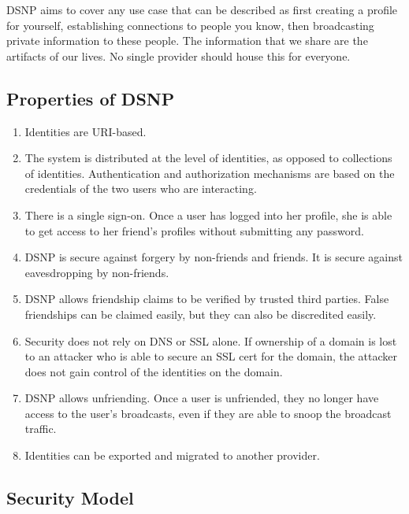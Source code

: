 \documentclass[letterpaper,11pt,oneside]{article}
\begin{document}
DSNP aims to cover any use case that can be described as first creating a
profile for yourself, establishing connections to people you know, then
broadcasting private information to these people. The information that we share
are the artifacts of our lives. No single provider should house this for
everyone.

\subsection{Properties of DSNP}

\begin{enumerate}

\item Identities are URI-based.

\item The system is distributed at the level of identities, as opposed to
collections of identities. Authentication and authorization mechanisms are
based on the credentials of the two users who are interacting.

\item There is a single sign-on. Once a user has logged into her profile, she
is able to get access to her friend's profiles without submitting any password.

\item DSNP is secure against forgery by non-friends and friends. It is secure
against eavesdropping by non-friends.

\item DSNP allows friendship claims to be verified by trusted third parties.
False friendships can be claimed easily, but they can also be discredited
easily.

\item Security does not rely on DNS or SSL alone. If ownership of a domain is
lost to an attacker who is able to secure an SSL cert for the domain, the
attacker does not gain control of the identities on the domain.

\item DSNP allows unfriending. Once a user is unfriended, they no longer have
access to the user's broadcasts, even if they are able to snoop the broadcast
traffic.

\item Identities can be exported and migrated to another provider.

\end{enumerate}

\subsection{Security Model}
\end{document}
